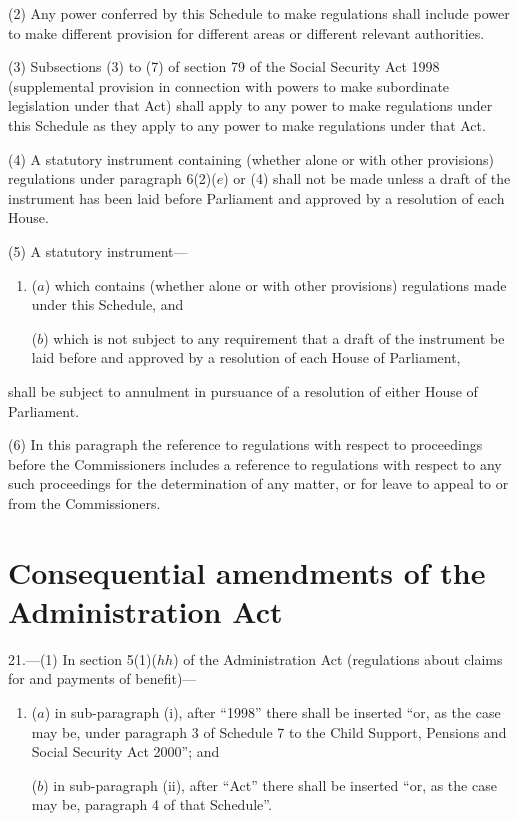 \documentclass[12pt,a4paper]{article}
\begin{document}
(2) Any power conferred by this Schedule to make regulations shall include power to make different provision for different areas or different relevant authorities.

(3) Subsections (3)  to (7)  of section 79 of the Social Security Act 1998 (supplemental provision in connection with powers to make subordinate legislation under that Act) shall apply to any power to make regulations under this Schedule as they apply to any power to make regulations under that Act.

(4) A statutory instrument containing (whether alone or with other provisions) regulations under paragraph 6(2)($e$)  or (4)  shall not be made unless a draft of the instrument has been laid before Parliament and approved by a resolution of each House.

(5) A statutory instrument—
\begin{enumerate}\item[]
($a$) which contains (whether alone or with other provisions) regulations made under this Schedule, and

($b$) which is not subject to any requirement that a draft of the instrument be laid before and approved by a resolution of each House of Parliament,
\end{enumerate}
shall be subject to annulment in pursuance of a resolution of either House of Parliament.

(6) In this paragraph the reference to regulations with respect to proceedings before the Commissioners includes a reference to regulations with respect to any such proceedings for the determination of any matter, or for leave to appeal to or from the Commissioners.


\section*{\sloppy Consequential amendments of the Administration Act}

21.---(1) In section 5(1)($hh$)  of the Administration Act (regulations about claims for and payments of benefit)—
\begin{enumerate}\item[]
($a$) in sub-paragraph (i), after “1998” there shall be inserted “or, as the case may be, under paragraph 3 of Schedule 7 to the Child Support, Pensions and Social Security Act 2000”; and

($b$) in sub-paragraph (ii), after “Act” there shall be inserted “or, as the case may be, paragraph 4 of that Schedule”.
\end{enumerate}
\end{document}
